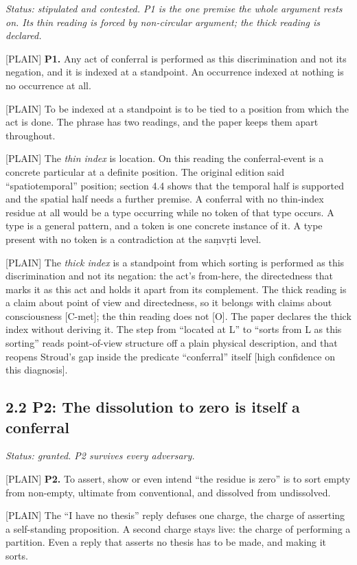 \documentclass[11pt]{article}
\newcommand{\register}[1]{{\ttfamily\small #1}}
\begin{document}
\emph{Status: stipulated and contested. P1 is the one premise the whole argument rests on. Its thin reading is forced by non-circular argument; the thick reading is declared.}

\register{[PLAIN]} \textbf{P1.} Any act of conferral is performed as this discrimination and not its negation, and it is indexed at a standpoint. An occurrence indexed at nothing is no occurrence at all.

\register{[PLAIN]} To be indexed at a standpoint is to be tied to a position from which the act is done. The phrase has two readings, and the paper keeps them apart throughout.

\register{[PLAIN]} The \emph{thin index} is location. On this reading the conferral-event is a concrete particular at a definite position. The original edition said ``spatiotemporal'' position; section 4.4 shows that the temporal half is supported and the spatial half needs a further premise. A conferral with no thin-index residue at all would be a type occurring while no token of that type occurs. A type is a general pattern, and a token is one concrete instance of it. A type present with no token is a contradiction at the saṃvṛti level.

\register{[PLAIN]} The \emph{thick index} is a standpoint from which sorting is performed as this discrimination and not its negation: the act's from-here, the directedness that marks it as this act and holds it apart from its complement. The thick reading is a claim about point of view and directedness, so it belongs with claims about consciousness [C-met]; the thin reading does not [O]. The paper declares the thick index without deriving it. The step from ``located at L'' to ``sorts from L as this sorting'' reads point-of-view structure off a plain physical description, and that reopens Stroud's gap inside the predicate ``conferral'' itself [high confidence on this diagnosis].

\subsection*{2.2 P2: The dissolution to zero is itself a conferral}

\emph{Status: granted. P2 survives every adversary.}

\register{[PLAIN]} \textbf{P2.} To assert, show or even intend ``the residue is zero'' is to sort empty from non-empty, ultimate from conventional, and dissolved from undissolved.

\register{[PLAIN]} The ``I have no thesis'' reply defuses one charge, the charge of asserting a self-standing proposition. A second charge stays live: the charge of performing a partition. Even a reply that asserts no thesis has to be made, and making it sorts.
\end{document}

